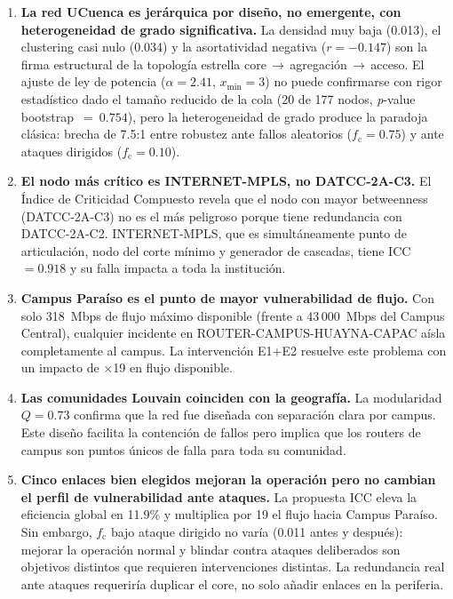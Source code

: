 \documentclass[12pt, a4paper]{article}
\newcommand{\fc}{f_{\mathrm{c}}}
\begin{document}
\begin{enumerate}
    \item \textbf{La red UCuenca es jerárquica por diseño, no emergente, con
    heterogeneidad de grado significativa.} La densidad muy baja (0.013),
    el clustering casi nulo (0.034) y la asortatividad negativa ($r=-0.147$)
    son la firma estructural de la topología estrella core\,$\to$\,agregación\,$\to$\,acceso.
    El ajuste de ley de potencia ($\alpha=2.41$, $x_{\min}=3$) no puede
    confirmarse con rigor estadístico dado el tamaño reducido de la cola (20
    de 177 nodos, \textit{p}-value bootstrap~$=~0.754$), pero la heterogeneidad
    de grado produce la paradoja clásica: brecha de 7.5:1 entre robustez ante
    fallos aleatorios ($\fc = 0.75$) y ante ataques dirigidos ($\fc = 0.10$).

    \item \textbf{El nodo más crítico es INTERNET-MPLS, no DATCC-2A-C3.}
    El Índice de Criticidad Compuesto revela que el nodo con mayor betweenness
    (DATCC-2A-C3) no es el más peligroso porque tiene redundancia con
    DATCC-2A-C2. INTERNET-MPLS, que es simultáneamente punto de articulación,
    nodo del corte mínimo y generador de cascadas, tiene ICC~$= 0.918$ y su
    falla impacta a toda la institución.

    \item \textbf{Campus Paraíso es el punto de mayor vulnerabilidad de flujo.}
    Con solo 318~Mbps de flujo máximo disponible (frente a 43\,000~Mbps del
    Campus Central), cualquier incidente en ROUTER-CAMPUS-HUAYNA-CAPAC aísla
    completamente al campus. La intervención E1+E2 resuelve este problema
    con un impacto de $\times$19 en flujo disponible.

    \item \textbf{Las comunidades Louvain coinciden con la geografía.}
    La modularidad $Q = 0.73$ confirma que la red fue diseñada con
    separación clara por campus. Este diseño facilita la contención de fallos
    pero implica que los routers de campus son puntos únicos de falla para
    toda su comunidad.

    \item \textbf{Cinco enlaces bien elegidos mejoran la operación pero no
    cambian el perfil de vulnerabilidad ante ataques.} La propuesta ICC
    eleva la eficiencia global en 11.9\% y multiplica por 19 el flujo hacia
    Campus Paraíso. Sin embargo, $\fc$ bajo ataque dirigido no varía (0.011
    antes y después): mejorar la operación normal y blindar contra ataques
    deliberados son objetivos distintos que requieren intervenciones distintas.
    La redundancia real ante ataques requeriría duplicar el core, no solo
    añadir enlaces en la periferia.
\end{enumerate}
\end{document}
